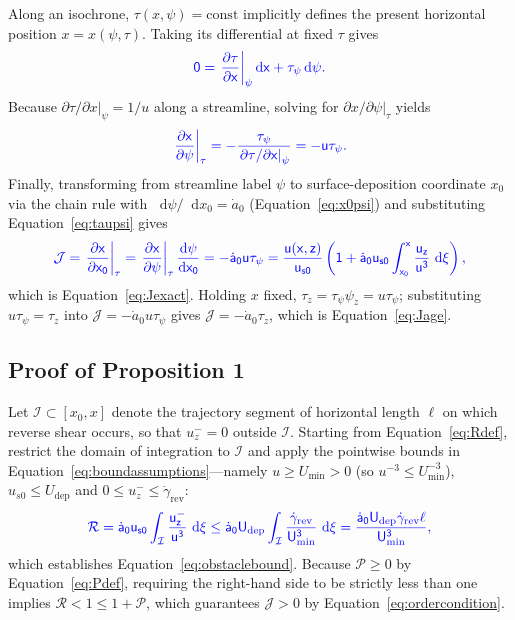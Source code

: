\documentclass[review]{igs}
\providecommand{\DIFadd}[1]{{\protect\color{blue} \sf #1}} %
\begin{document}
\DIFadd{Along an isochrone, \(\tau(x,\psi)=\text{const}\) implicitly defines the present horizontal position \(x=x(\psi,\tau)\). Taking its differential at fixed \(\tau\) gives
}\begin{equation}
\DIFadd{0=\left.\frac{\partial\tau}{\partial x}\right|_{\psi}\mathop{}\!\mathrm{d} x
+\tau_{\psi}\mathop{}\!\mathrm{d}\psi.
}\end{equation}
\DIFadd{Because \(\left.\partial\tau/\partial x\right|_{\psi}=1/u\) along a streamline, solving for \(\left.\partial x/\partial\psi\right|_{\tau}\) yields
}\begin{equation}
\DIFadd{\left.\frac{\partial x}{\partial\psi}\right|_{\tau}
=-\frac{\tau_{\psi}}{\left.\partial\tau/\partial x\right|_{\psi}}
=-u\tau_{\psi}.
}\end{equation}
\DIFadd{Finally, transforming from streamline label \(\psi\) to surface-deposition coordinate \(x_0\) via the chain rule with \(\mathop{}\!\mathrm{d}\psi/\mathop{}\!\mathrm{d} x_0=\dot a_0\) (Equation~\ref{eq:x0psi}) and substituting Equation~\ref{eq:taupsi} gives
}\begin{equation}
\DIFadd{\mathcal{J}
=\left.\frac{\partial x}{\partial x_0}\right|_{\tau}
=\left.\frac{\partial x}{\partial\psi}\right|_{\tau}\frac{\mathop{}\!\mathrm{d}\psi}{\mathop{}\!\mathrm{d} x_0}
=-\dot a_0 u\tau_{\psi}
=\frac{u(x,z)}{u_{s0}}
\left(
1+\dot a_0u_{s0}
\int_{x_0}^{x}\frac{u_z}{u^3}\,\mathop{}\!\mathrm{d}\xi
\right),
}\end{equation}
\DIFadd{which is Equation~\ref{eq:Jexact}. Holding \(x\) fixed, \(\tau_z=\tau_{\psi}\psi_z=u\tau_{\psi}\); substituting \(u\tau_{\psi}=\tau_z\) into \(\mathcal{J}=-\dot a_0 u\tau_{\psi}\) gives \(\mathcal{J}=-\dot a_0\tau_z\), which is Equation~\ref{eq:Jage}.
}

\subsection{Proof of Proposition 1}

\DIFadd{Let \(\mathcal{I}\subset[x_0,x]\) denote the trajectory segment of horizontal length \(\ell\) on which reverse shear occurs, so that \(u_z^-=0\) outside \(\mathcal{I}\). Starting from Equation~\ref{eq:Rdef}, restrict the domain of integration to \(\mathcal{I}\) and apply the pointwise bounds in Equation~\ref{eq:boundassumptions}---namely \(u\geq U_{\min}>0\) (so \(u^{-3}\leq U_{\min}^{-3}\)), \(u_{s0}\leq U_{\mathrm{dep}}\) and \(0\leq u_z^-\leq\dot\gamma_{\mathrm{rev}}\):
}\begin{equation}
\DIFadd{\mathcal{R}
=\dot a_0u_{s0}\int_{\mathcal{I}}\frac{u_z^-}{u^3}\,\mathop{}\!\mathrm{d}\xi
\leq \dot a_0 U_{\mathrm{dep}}\int_{\mathcal{I}}\frac{\dot\gamma_{\mathrm{rev}}}{U_{\min}^{3}}\,\mathop{}\!\mathrm{d}\xi
=\frac{\dot a_0U_{\mathrm{dep}}\dot\gamma_{\mathrm{rev}}\ell}{U_{\min}^{3}},
}\end{equation}
\DIFadd{which establishes Equation~\ref{eq:obstaclebound}. Because \(\mathcal{P}\geq0\) by Equation~\ref{eq:Pdef}, requiring the right-hand side to be strictly less than one implies \(\mathcal{R}<1\leq 1+\mathcal{P}\), which guarantees \(\mathcal{J}>0\) by Equation~\ref{eq:ordercondition}.
}
\end{document}
